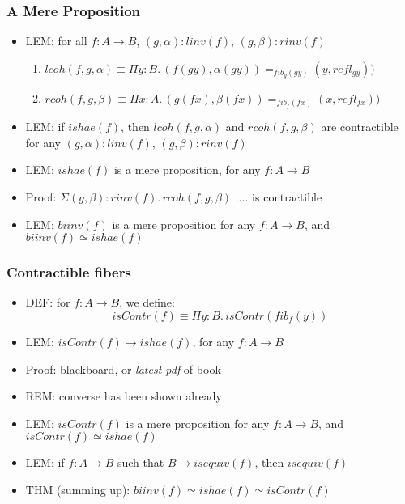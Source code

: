 \documentclass[handout]{beamer}
\newcommand{\depi}[3]{\Pi{#1{:}#2.\,#3}}
\newcommand{\sigm}[3]{\Sigma{#1{:}#2.\,#3}}
\begin{document}
\frame
  {
    \frametitle{A Mere Proposition}

    \begin{itemize}[<+->]
    \item LEM: for all $f:A\to B$,  $(g,\alpha):linv(f)$,  $(g,\beta):rinv(f)$
      \begin{enumerate}[<+->]
      \item $lcoh(f,g,\alpha) \equiv {\depi{y}{B}{(f(g y),\alpha(gy)) =_{fib_g(gy)} (y,refl_{gy}))}}$ 
      \item $rcoh(f,g,\beta) \equiv {\depi{x}{A}{(g(fx), \beta(fx)) =_{fib_f(fx)} (x,refl_{fx}))}}$     
      \end{enumerate}    
    \item LEM: if $ishae(f)$, then $lcoh(f,g,\alpha)$ and $rcoh(f,g,\beta)$ are contractible
    for any $(g,\alpha):linv(f)$,  $(g,\beta):rinv(f)$
    \item LEM: $ishae(f)$ is a mere proposition, for any $f:A\to B$
    \item Proof: $\sigm{(g,\beta)}{rinv(f)}{rcoh(f,g,\beta)}$ .... is contractible
    \item LEM: $biinv(f)$ is a mere proposition for any $f:A\to B$, and $biinv(f)\simeq ishae(f)$
    \end{itemize}
  }

\frame
  {
    \frametitle{Contractible fibers}

    \begin{itemize}[<+->]
    \item DEF: for $f:A\to B$,  we define:
    \[isContr(f) \equiv \depi{y}{B}{isContr(fib_f(y))}\]    
    \item LEM: $isContr(f) \to ishae(f)$, for any $f:A\to B$
    \item Proof: blackboard, or \emph{latest pdf} of book
    \item REM: converse has been shown already
    \item LEM: $isContr(f)$ is a mere proposition for any $f:A\to B$, and $isContr(f)\simeq ishae(f)$
    \item LEM: if $f:A\to B$ such that $B\to isequiv(f)$, then $isequiv(f)$
    \item THM (summing up): $biinv(f)\simeq ishae(f)\simeq isContr(f)$
    \end{itemize}
  }
  
\end{document}
